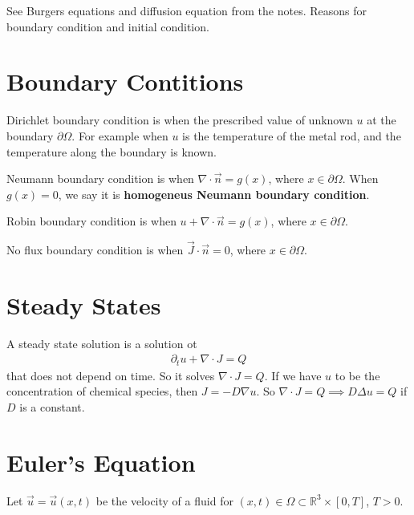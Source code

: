 

See Burgers equations and diffusion equation from the notes.
Reasons for boundary condition and initial condition.

\section{Boundary Contitions}
\begin{definition}
  Dirichlet boundary condition is when the prescribed value of
  unknown $u$ at the boundary $\partial \Omega$. For example when $u$
  is the temperature of the metal rod, and the temperature along the
  boundary is known.
\end{definition}

\begin{definition}
  Neumann boundary condition is when $\nabla \cdot \vec{n} = g(x)$,
  where $x \in \partial \Omega$. When $ g(x) = 0$, we say it is
  \textbf{homogeneus Neumann boundary condition}.
\end{definition}

\begin{definition}
  Robin boundary condition is when $u + \nabla \cdot \vec{n} = g(x)$,
  where $x \in \partial \Omega$.
\end{definition}

\begin{definition}
  No flux boundary condition is when $\vec{J}\cdot\vec{n} = 0$, where
  $ x \in \partial \Omega$.
\end{definition}

\section{Steady States}

A steady state solution is a solution ot
\begin{align*}
  \partial_t u + \nabla\cdot J = Q
\end{align*}
that does not depend on time. So it solves $\nabla \cdot J = Q$.
If we have $u$ to be the concentration of chemical species, then $J =
- D \nabla u$. So $\nabla \cdot J = Q \implies D \Delta u = Q$ if $D$
is a constant.

\section{Euler's Equation}
Let $\vec{u} = \vec{u}(x, t)$ be the velocity of a fluid for $(x, t)
\in \Omega \subset \mathbb{R}^3 \times [0, T]$, $T > 0$.

